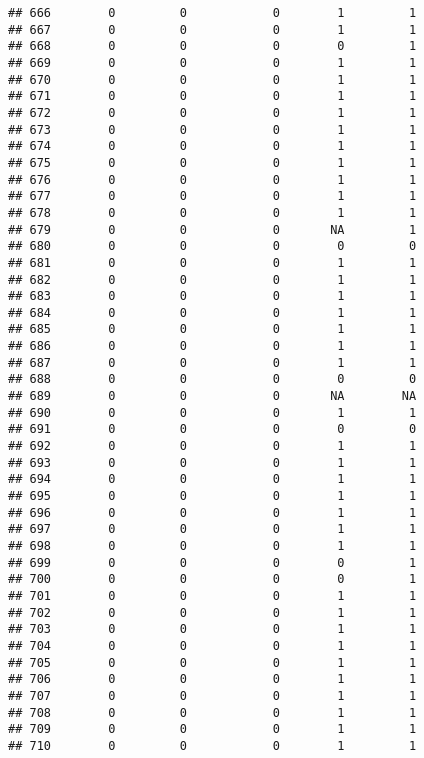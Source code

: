 \documentclass[
]{article}
\begin{document}
\begin{verbatim}
## 666        0         0            0        1         1
## 667        0         0            0        1         1
## 668        0         0            0        0         1
## 669        0         0            0        1         1
## 670        0         0            0        1         1
## 671        0         0            0        1         1
## 672        0         0            0        1         1
## 673        0         0            0        1         1
## 674        0         0            0        1         1
## 675        0         0            0        1         1
## 676        0         0            0        1         1
## 677        0         0            0        1         1
## 678        0         0            0        1         1
## 679        0         0            0       NA         1
## 680        0         0            0        0         0
## 681        0         0            0        1         1
## 682        0         0            0        1         1
## 683        0         0            0        1         1
## 684        0         0            0        1         1
## 685        0         0            0        1         1
## 686        0         0            0        1         1
## 687        0         0            0        1         1
## 688        0         0            0        0         0
## 689        0         0            0       NA        NA
## 690        0         0            0        1         1
## 691        0         0            0        0         0
## 692        0         0            0        1         1
## 693        0         0            0        1         1
## 694        0         0            0        1         1
## 695        0         0            0        1         1
## 696        0         0            0        1         1
## 697        0         0            0        1         1
## 698        0         0            0        1         1
## 699        0         0            0        0         1
## 700        0         0            0        0         1
## 701        0         0            0        1         1
## 702        0         0            0        1         1
## 703        0         0            0        1         1
## 704        0         0            0        1         1
## 705        0         0            0        1         1
## 706        0         0            0        1         1
## 707        0         0            0        1         1
## 708        0         0            0        1         1
## 709        0         0            0        1         1
## 710        0         0            0        1         1

\end{verbatim}
\end{document}
